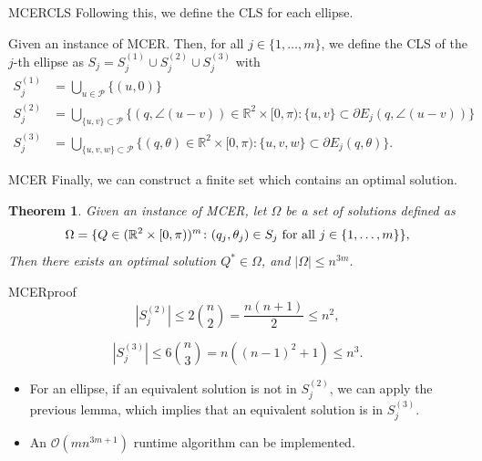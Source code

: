 \documentclass{beamer}
\newcommand{\R}{\mathbb{R}}
\newcommand{\Pp}{\mathscr{P}}
\newcommand{\bigO}{\mathscr{O}}
\newtheorem{thm}{Theorem}
\theoremstyle{definition}
\begin{document}
\begin{frame}{MCER}{CLS}
	Following this, we define the CLS for each ellipse.
	
	\begin{definition}\label{def:Sj}
		Given an instance of MCER. Then, for all $j\in\{1, \dots, m\}$, we define the CLS of the $j$-th ellipse as $S_j = S_j^{(1)} \cup S_j^{(2)} \cup S_j^{(3)}$ with
		\begin{align*}
		S_j^{(1)} &= \bigcup_{u \in \Pp} \{(u, 0)\}\\
		S_j^{(2)} &= \bigcup_{\{u, v\} \subset \Pp} \{(q, \angle(u-v))\in \R^2\times[0, \pi): \{u,v\} \subset \partial E_j(q, \angle(u-v))\}\\
		S_j^{(3)} &= \bigcup_{\{u, v, w\} \subset \Pp} \{(q, \theta)\in \R^2\times[0, \pi): \{u, v, w\} \subset \partial E_j(q, \theta)\}.
		\end{align*}
	\end{definition}
\end{frame}

\begin{frame}{MCER}
	Finally, we can construct a finite set which contains an optimal solution.
	
	\begin{thm}\label{th:mcer}
		Given an instance of MCER, let $\Omega$ be a set of solutions defined as 
		\begin{equation*}\label{eq:omega}
		\Omega = \{Q \in (\R^2\times[0, \pi))^m \colon (q_j, \theta_j) \in S_j \textnormal{ for all } j\in\{1, \dots, m\}\},
		\end{equation*}
		Then there exists an optimal solution $Q^* \in \Omega$, and $|\Omega|\le n^{3m}$.
	\end{thm}
\end{frame}

\begin{frame}{MCER}{proof}
$$|S_j^{(2)}| \le 2 \binom{n}{2} = \frac{n(n+1)}{2} \le n^2,$$

$$|S_j^{(3)}| \le 6 \binom{n}{3} = n((n-1)^2+1) \le n^3.$$

\begin{itemize}
	\item For an ellipse, if an equivalent solution is not in $S_j^{(2)}$, we can apply the previous lemma, which implies that an equivalent solution is in $S_j^{(3)}$.
	
	\item An $\bigO(mn^{3m+1})$ runtime algorithm can be implemented.
\end{itemize}
\end{frame}
\end{document}
